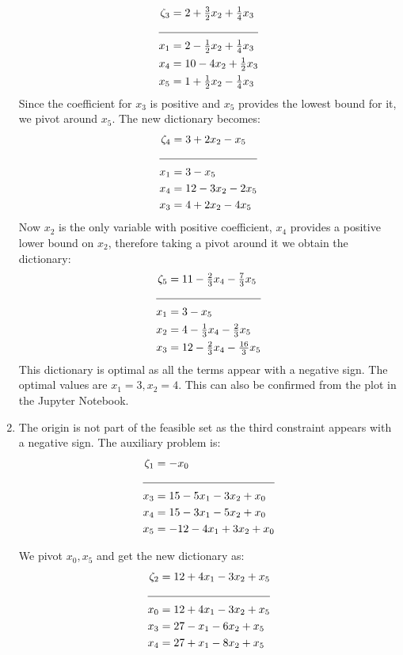 \documentclass[letterpaper,12pt]{article}
\theoremstyle{definition}
\begin{document}
\begin{enumerate}
  \begin{align*}
    \zeta_3 &= 2 + \tfrac{3}{2}x_2+\tfrac{1}{4}x_3\\
    \cline{1-2}
    x_1 &= 2 - \tfrac{1}{2}x_2 + \tfrac{1}{4}x_3\\
    x_4 &= 10 - 4x_2 +\tfrac{1}{2}x_3\\
    x_5 &= 1 + \tfrac{1}{2}x_2 - \tfrac{1}{4}x_3\\
  \end{align*}
  Since the coefficient for  $x_3$ is positive and $x_5$ provides the lowest bound for it, we pivot around $x_5$. The new dictionary becomes:
  \begin{align*}
    \zeta_4 &= 3+2x_2-x_5\\
    \cline{1-2}
    x_1 &= 3 - x_5\\
    x_4 &=12-3x_2-2x_5\\
    x_3 &= 4+2x_2-4x_5\\
  \end{align*}
Now $x_2$ is the only variable with positive coefficient, $x_4$ provides a positive lower bound on $x_2$, therefore taking a pivot around it we  obtain the dictionary:
\begin{align*}
  \zeta_5 &= 11- \tfrac{2}{3}x_4- \tfrac{7}{3}x_5\\
  \cline{1-2}
  x_1 &= 3-x_5\\
  x_2 &= 4 - \tfrac{1}{3}x_4 - \tfrac{2}{3}x_5\\
  x_3 &= 12 - \tfrac{2}{3}x_4 - \tfrac{16}{3}x_5
\end{align*}
This dictionary is optimal as all the terms appear with a negative sign. The optimal values are $x_1=3, x_2=4$.
This can also be confirmed from the plot in the Jupyter Notebook.

\item The origin is not part of the feasible set as the third constraint appears with a negative sign.
The auxiliary problem is:
\begin{align*}
  \zeta_1 &= -x_0\\
  \cline{1-2}
  x_3 &= 15-5x_1-3x_2+x_0\\
  x_4 &= 15-3x_1-5x_2+x_0\\
  x_5 &= -12 -4x_1+3x_2+x_0\\
\end{align*}

We pivot $x_0, x_5$ and get the new dictionary as:
\begin{align*}
  \zeta_2 &= 12+4x_1-3x_2+x_5\\
  \cline{1-2}
  x_0 &= 12+4x_1-3x_2+x_5\\
  x_3 &= 27-x_1 - 6x_2+x_5\\
  x_4 &= 27+x_1- 8x_2+x_5\\
\end{align*}


\end{enumerate}
\end{document}
